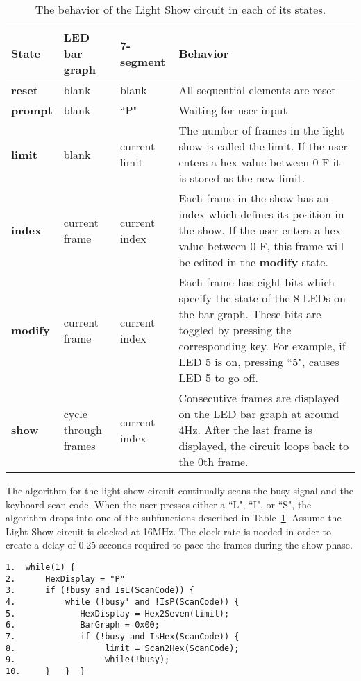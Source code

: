 \begin{description}
\begin{table}
\begin{tabular}{l|p{0.5in}|p{0.5in}|p{2.0in}}
\textbf{ State }	& LED bar graph	& 7-segment	& Behavior 				\\ \hline \hline
\textbf{ reset }	& blank		& blank		& All sequential elements are reset 	\\ \hline
\textbf{ prompt }	& blank		& ``P"		& Waiting for user input		\\ \hline
\textbf{ limit }	& blank		& current limit	& The number of frames in the light show is called 
    the limit. If the user enters a hex value between 0-F it is stored as the new limit. \\  \hline
\textbf{ index }	& current frame	& current index	& Each frame in the show has an index which defines 
    its position in the show. If the user enters a hex value between 0-F, this frame will 
    be edited in the \textbf{ modify } state. 						\\ \hline
\textbf{ modify }	& current frame	& current index	& Each frame has eight bits which specify the state of 
    the 8 LEDs on the bar graph.  These bits are toggled by pressing the corresponding 
    key. For example, if LED 5 is on, pressing ``5", causes LED 5 
    to go off.								\\ \hline
\textbf{ show }	& cycle through frames & current index & Consecutive frames are displayed on the 
    LED bar graph at around 4Hz. After the last frame is displayed, the circuit loops 
    back to the 0th frame. 							\\ 
\end{tabular}
\caption{The behavior of the Light Show circuit in each of its states.}
\label{table:LSbehavior}
\end{table}

The algorithm for the light show circuit continually scans the busy signal 
and the keyboard scan code.  When the user presses either a ``L", 
``I", or ``S", 
the algorithm drops into one of the subfunctions described in 
Table~\ref{table:LSbehavior}.  Assume the Light Show circuit is
clocked at 16MHz.  The clock rate is needed in order to create a delay of
0.25 seconds required to pace the frames during the show phase.  

\pagebreak
\begin{verbatim}
1.  while(1) {
2.      HexDisplay = "P"
3.      if (!busy and IsL(ScanCode)) {
4.          while (!busy' and !IsP(ScanCode)) {
5.             HexDisplay = Hex2Seven(limit);
6.             BarGraph = 0x00;
7.             if (!busy and IsHex(ScanCode)) {
8.                  limit = Scan2Hex(ScanCode);
9.                  while(!busy);
10.     }   }  }


\end{verbatim}
\end{description}

